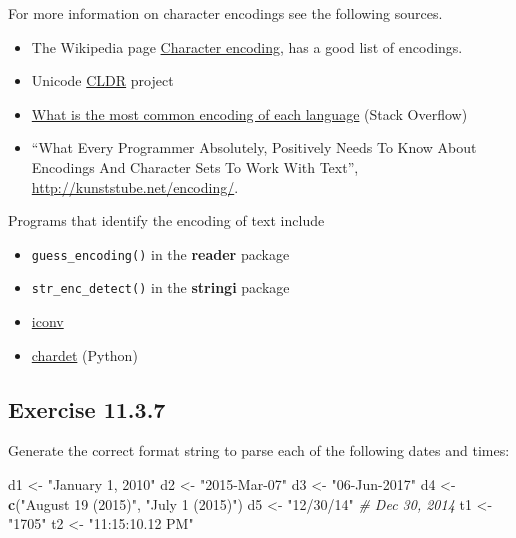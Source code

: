 \documentclass[]{book}
\newenvironment{Shaded}{\begin{snugshade}}{\end{snugshade}}
\newcommand{\CommentTok}[1]{\textcolor[rgb]{0.56,0.35,0.01}{\textit{#1}}}
\newcommand{\KeywordTok}[1]{\textcolor[rgb]{0.13,0.29,0.53}{\textbf{#1}}}
\newcommand{\NormalTok}[1]{#1}
\newcommand{\StringTok}[1]{\textcolor[rgb]{0.31,0.60,0.02}{#1}}
\providecommand{\tightlist}{%
  \setlength{\itemsep}{0pt}\setlength{\parskip}{0pt}}
\theoremstyle{plain}
\theoremstyle{remark}
\theoremstyle{definition}
\theoremstyle{definition}
\theoremstyle{definition}
\theoremstyle{remark}
\begin{document}
For more information on character encodings see the following sources.

\begin{itemize}
\tightlist
\item
  The Wikipedia page
  \href{https://en.wikipedia.org/wiki/Character_encoding}{Character
  encoding}, has a good list of encodings.
\item
  Unicode \href{http://cldr.unicode.org/}{CLDR} project
\item
  \href{http://stackoverflow.com/questions/8509339/what-is-the-most-common-encoding-of-each-language}{What
  is the most common encoding of each language} (Stack Overflow)
\item
  ``What Every Programmer Absolutely, Positively Needs To Know About
  Encodings And Character Sets To Work With Text'',
  \url{http://kunststube.net/encoding/}.
\end{itemize}

Programs that identify the encoding of text include

\begin{itemize}
\tightlist
\item
  \texttt{guess\_encoding()} in the \textbf{reader} package
\item
  \texttt{str\_enc\_detect()} in the \textbf{stringi} package
\item
  \href{https://en.wikipedia.org/wiki/Iconv}{iconv}
\item
  \href{https://github.com/chardet/chardet}{chardet} (Python)
\end{itemize}

\hypertarget{exercise-11.3.7}{%
\subsection*{\texorpdfstring{Exercise
{11.3.7}}{Exercise 11.3.7}}\label{exercise-11.3.7}}

Generate the correct format string to parse each of the following dates
and times:

\begin{Shaded}
\begin{Highlighting}[]
\NormalTok{d1 <-}\StringTok{ "January 1, 2010"}
\NormalTok{d2 <-}\StringTok{ "2015-Mar-07"}
\NormalTok{d3 <-}\StringTok{ "06-Jun-2017"}
\NormalTok{d4 <-}\StringTok{ }\KeywordTok{c}\NormalTok{(}\StringTok{"August 19 (2015)"}\NormalTok{, }\StringTok{"July 1 (2015)"}\NormalTok{)}
\NormalTok{d5 <-}\StringTok{ "12/30/14"} \CommentTok{# Dec 30, 2014}
\NormalTok{t1 <-}\StringTok{ "1705"}
\NormalTok{t2 <-}\StringTok{ "11:15:10.12 PM"}
\end{Highlighting}
\end{Shaded}
\end{document}
